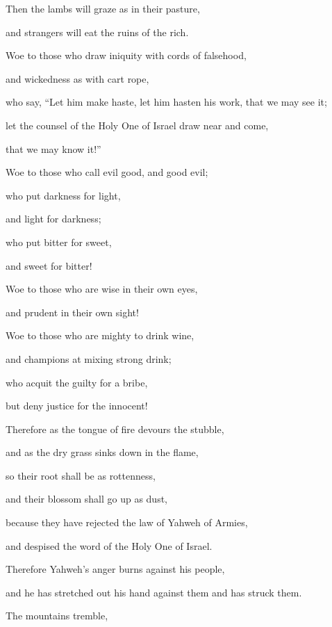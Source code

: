 {\par }{\Q {}Then the lambs will graze as in their pasture,
\par }{\QB and strangers will eat the ruins of the rich.
\par }{\BB \par }{\Q {}Woe to those who draw iniquity with cords of falsehood,
\par }{\QB and wickedness as with cart rope,
\par }{\Q {}who say, “Let him make haste, let him hasten his work, that we may see it;
\par }{\QB let the counsel of the Holy One of Israel draw near and come,
\par }{\QB that we may know it!”
\par }{\Q {}Woe to those who call evil good, and good evil;
\par }{\QB who put darkness for light,
\par }{\QB and light for darkness;
\par }{\Q who put bitter for sweet,
\par }{\QB and sweet for bitter!
\par }{\Q {}Woe to those who are wise in their own eyes,
\par }{\QB and prudent in their own sight!
\par }{\Q {}Woe to those who are mighty to drink wine,
\par }{\QB and champions at mixing strong drink;
\par }{\Q {}who acquit the guilty for a bribe,
\par }{\QB but deny justice for the innocent!
\par }{\BB \par }{\Q {}Therefore as the tongue of fire devours the stubble,
\par }{\QB and as the dry grass sinks down in the flame,
\par }{\QB so their root shall be as rottenness,
\par }{\QB and their blossom shall go up as dust,
\par }{\Q because they have rejected the law of Yahweh of Armies,
\par }{\QB and despised the word of the Holy One of Israel.
\par }{\Q {}Therefore Yahweh’s anger burns against his people,
\par }{\QB and he has stretched out his hand against them and has struck them.
\par }{\Q The mountains tremble,
}
